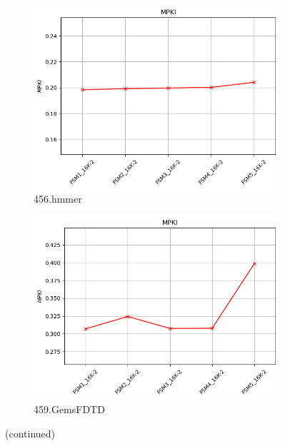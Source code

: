 \documentclass{article}
\begin{document}
\begin{figure}[H]
     \vspace{0.5cm} %
 
     \begin{subfigure}[b]{0.45\textwidth}
         \includegraphics[width=\textwidth]{figures/5_3_b/456.hmmer.cslab_branch_preds_ref.out.png}
         \caption{456.hmmer}
         \label{fig:plot27}
     \end{subfigure}
     \hfill
     \begin{subfigure}[b]{0.45\textwidth}
         \includegraphics[width=\textwidth]{figures/5_3_b/459.GemsFDTD.cslab_branch_preds_ref.out.png}
         \caption{459.GemsFDTD}
         \label{fig:plot28}
     \end{subfigure}
     \vspace{0.5cm} 
 
     \caption{(continued)}
     \label{fig:fsm_part2}
 \end{figure}
 
\end{document}
